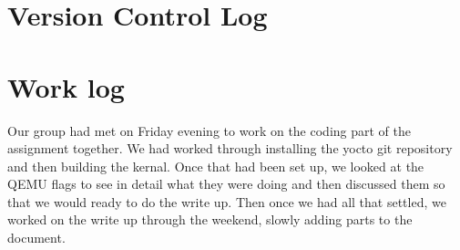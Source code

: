 \documentclass[10pt,draftclsnofoot]{article}
\begin{document}
\section{Version Control Log}


\section{Work log}
Our group had met on Friday evening to work on the coding part of the assignment 
together. We had worked through installing the yocto git repository and then building 
the kernal. Once that had been set up, we looked at the QEMU flags to see in detail 
what they were doing and then discussed them so that we would ready to do the write up. 
Then once we had all that settled, we worked on the write up through the weekend,
slowly adding parts to the document. 
\end{document}
